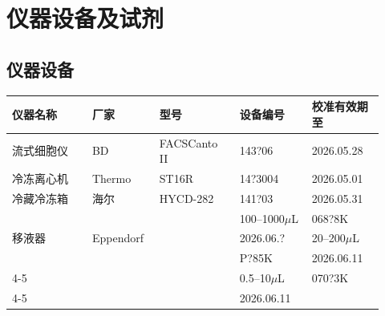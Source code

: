 \documentclass[UTF8,10pt,a4paper,fontset=fandol]{ctexart}
\newcommand{\fieldvalue}[1]{#1}
\newcommand{\handwritten}[1]{#1}
\begin{document}
\section{仪器设备及试剂}

\subsection{仪器设备}

\begin{tabular}{|p{0.20\linewidth}|p{0.16\linewidth}|p{0.20\linewidth}|p{0.18\linewidth}|p{0.18\linewidth}|}
\hline
仪器名称 & 厂家 & 型号 & 设备编号 & 校准有效期至\\
\hline
流式细胞仪 & BD & FACSCanto II &
\fieldvalue{\handwritten{143?06}} &
\fieldvalue{\handwritten{2026.05.28}}\\
\hline
冷冻离心机 & Thermo & ST16R &
\fieldvalue{\handwritten{14?3004}} &
\fieldvalue{\handwritten{2026.05.01}}\\
\hline
冷藏冷冻箱 & 海尔 & HYCD-282 &
\fieldvalue{\handwritten{141?03}} &
\fieldvalue{\handwritten{2026.05.31}}\\
\hline
\multirow{3}{*}{移液器} & \multirow{3}{*}{Eppendorf} & \multirow{3}{*}{} &
\fieldvalue{\handwritten{100--1000$\mu$L}} &
\fieldvalue{\handwritten{068?8K}}\\
\cline{4-5}
& & &
\fieldvalue{\handwritten{2026.06.?}} &
\fieldvalue{\handwritten{20--200$\mu$L}}\\
\cline{4-5}
& & &
\fieldvalue{\handwritten{P?85K}} &
\fieldvalue{\handwritten{2026.06.11}}\\
\cline{4-5}
& & &
\fieldvalue{\handwritten{0.5--10$\mu$L}} &
\fieldvalue{\handwritten{070?3K}}\\
\cline{4-5}
& & &
\fieldvalue{\handwritten{2026.06.11}} & \\
\hline
\end{tabular}
\end{document}
